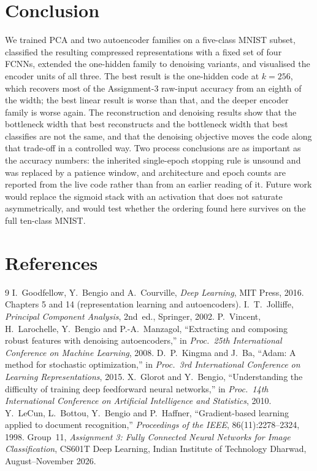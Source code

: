 \documentclass[11pt,a4paper]{article}
\begin{document}
\section{Conclusion}\label{sec:conclusion}
We trained PCA and two autoencoder families on a five-class MNIST subset, classified the resulting
compressed representations with a fixed set of four FCNNs, extended the one-hidden family to
denoising variants, and visualised the encoder units of all three.  The best result is the
one-hidden code at $k=256$, which recovers most of the Assignment-3 raw-input accuracy from an
eighth of the width; the best linear result is worse than that, and the deeper encoder family is
worse again.  The reconstruction and denoising results show that the bottleneck width that best
reconstructs and the bottleneck width that best classifies are not the same, and that the denoising
objective moves the code along that trade-off in a controlled way.  Two process conclusions are as
important as the accuracy numbers: the inherited single-epoch stopping rule is unsound and was
replaced by a patience window, and architecture and epoch counts are reported from the live code
rather than from an earlier reading of it.  Future work would replace the sigmoid stack with an
activation that does not saturate asymmetrically, and would test whether the ordering found here
survives on the full ten-class MNIST.

\section{References}\label{sec:refs}
\begin{thebibliography}{9}
 I.~Goodfellow, Y.~Bengio and A.~Courville, \emph{Deep Learning}, MIT Press,
  2016.  Chapters 5 and 14 (representation learning and autoencoders).
 I.~T.~Jolliffe, \emph{Principal Component Analysis}, 2nd~ed., Springer, 2002.
 P.~Vincent, H.~Larochelle, Y.~Bengio and P.-A.~Manzagol, ``Extracting and
  composing robust features with denoising autoencoders,'' in \emph{Proc.\ 25th International
  Conference on Machine Learning}, 2008.
 D.~P.~Kingma and J.~Ba, ``Adam: A method for stochastic optimization,'' in
  \emph{Proc.\ 3rd International Conference on Learning Representations}, 2015.
 X.~Glorot and Y.~Bengio, ``Understanding the difficulty of training deep
  feedforward neural networks,'' in \emph{Proc.\ 14th International Conference on Artificial
  Intelligence and Statistics}, 2010.
 Y.~LeCun, L.~Bottou, Y.~Bengio and P.~Haffner, ``Gradient-based learning applied
  to document recognition,'' \emph{Proceedings of the IEEE}, 86(11):2278--2324, 1998.
 Group~11, \emph{Assignment 3: Fully Connected Neural Networks for Image
  Classification}, CS601T Deep Learning, Indian Institute of Technology Dharwad, August--November
  2026.
\end{thebibliography}
\end{document}
